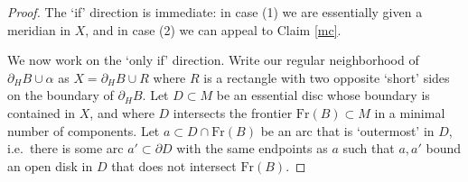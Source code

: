 \documentclass[12pt]{amsart}
\theoremstyle{definition}
\theoremstyle{remark}
\begin{document}
\begin{proof}
The `if' direction is immediate: in case (1) we are essentially given a meridian in $X$, and in case (2) we can appeal to Claim \ref{mc}.
%
%
%

We now work on the `only if' direction. Write our regular neighborhood of $\partial_H B  \cup \alpha$ as $X=\partial_H B \cup R$ where $R$ is a rectangle with two opposite `short' sides on the boundary of $\partial_H B$. Let $D \subset M$ be an essential disc whose boundary is contained in $X$, and where $D$ intersects the frontier $\mathrm{Fr}(B)\subset M$ in a minimal number of components. Let $a \subset D \cap \mathrm{Fr}(B)$ be an arc that is `outermost' in $D$, i.e.\ there is some arc $a'\subset \partial D$ with the same endpoints as $a$ such that $a,a'$ bound an open disk in $D$ that does not intersect $\mathrm{Fr}(B)$. 
 

\end{proof}
\end{document}
